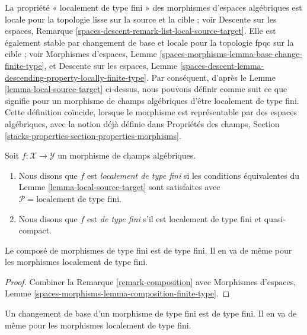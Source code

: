 \noindent
La propriété « localement de type fini » des morphismes d'espaces
algébriques est locale pour la topologie lisse sur la source et la cible ;
voir Descente sur les espaces, Remarque
\ref{spaces-descent-remark-list-local-source-target}.
Elle est également stable par changement de base et locale pour la
topologie fpqc sur la cible ; voir Morphismes d'espaces, Lemme
\ref{spaces-morphisms-lemma-base-change-finite-type}, et Descente sur les
espaces, Lemme
\ref{spaces-descent-lemma-descending-property-locally-finite-type}.
Par conséquent, d'après le Lemme \ref{lemma-local-source-target}
ci-dessus, nous pouvons définir comme suit ce que signifie pour un morphisme
de champs algébriques d'être localement de type fini. Cette définition
coïncide, lorsque le morphisme est représentable par des espaces algébriques,
avec la notion déjà définie dans Propriétés des champs, Section
\ref{stacks-properties-section-properties-morphisms}.

\begin{definition}
\label{definition-locally-finite-type}
Soit $f : \mathcal{X} \to \mathcal{Y}$ un morphisme de champs algébriques.
\begin{enumerate}
\item Nous disons que $f$ est {\it localement de type fini} si les
conditions équivalentes du Lemme \ref{lemma-local-source-target}
sont satisfaites avec
$\mathcal{P} = \text{localement de type fini}$.
\item Nous disons que $f$ est {\it de type fini} s'il est localement
de type fini et quasi-compact.
\end{enumerate}
\end{definition}

\begin{lemma}
\label{lemma-composition-finite-type}
Le composé de morphismes de type fini est de type fini.
Il en va de même pour les morphismes localement de type fini.
\end{lemma}

\begin{proof}
Combiner la Remarque \ref{remark-composition} avec Morphismes d'espaces,
Lemme \ref{spaces-morphisms-lemma-composition-finite-type}.
\end{proof}

\begin{lemma}
\label{lemma-base-change-finite-type}
Un changement de base d'un morphisme de type fini est de type fini.
Il en va de même pour les morphismes localement de type fini.
\end{lemma}

